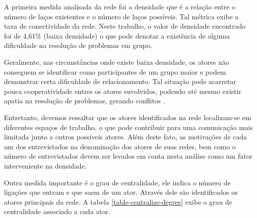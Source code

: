 A primeira medida analisada da rede foi a densidade que é a relação entre o número de laços existentes e o número de laços possíveis. Tal métrica exibe a taxa de conectividade da rede. Neste trabalho, o valor de densidade encontrado foi de 4,61\% (baixa densidade) o que pode denotar a existência de alguma dificuldade na resolução de problemas em grupo.

Geralmente, nas circunstâncias onde existe baixa densidade, os atores não conseguem se identificar como participantes de um grupo maior e podem demonstrar certa dificuldade de relacionamento. Tal situação pode acarretar pouca cooperatividade entres os atores envolvidos, podendo até mesmo existir apatia na resolução de problemas, gerando conflitos \cite{hanneman2001centralidad}.

Entretanto, devemos ressaltar que os atores identificados na rede localizam-se em diferentes espaços de trabalho, o que pode contribuir para uma comunicação mais limitada junto a outros possíveis atores. Além deste fato, as motivações de cada um dos entrevistados na denominação dos atores de suas redes, bem como o número de entrevistados devem ser levados em conta nesta análise como um fator interveniente na densidade. 

Outra medida importante é o grau de centralidade, ele indica o número de ligações que entram e que saem de um ator. Através dele são identificados os atores principais da rede. A tabela \ref{table-centralize-degree} exibe o grau de centralidade associado a cada ator.

